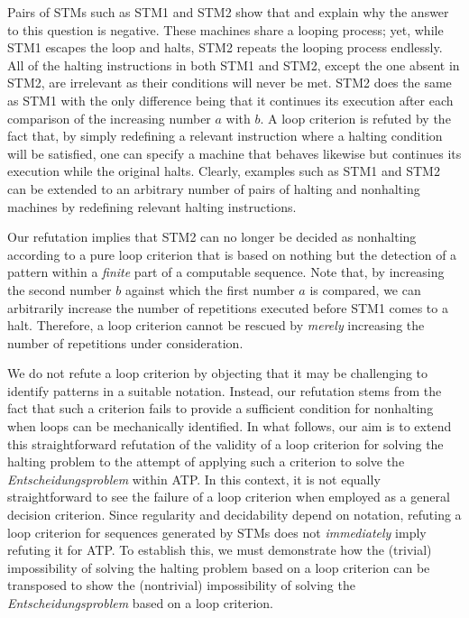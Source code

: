 \documentclass[%
  manuscript=article,   %
  year=2024,
  volume=77,
  doi=00000.000,
]{zfn}
\begin{document}
Pairs of STMs such as STM1 and STM2 show that and explain why the answer to this question is negative. 
These machines share a looping process; yet, while STM1 escapes the loop and halts, STM2 repeats the looping process endlessly. All of the halting instructions in both STM1 and STM2, except the one absent in STM2, are irrelevant as their conditions will never be met. STM2 does the same as STM1 with the only difference being that it continues its execution after each comparison of the increasing number $a$ with $b$.  A loop criterion is refuted by the fact that, by simply redefining a relevant instruction where a halting condition will be satisfied, one can specify a machine that behaves likewise but continues its execution while the original halts. Clearly, examples such as STM1 and STM2 can be extended to an arbitrary number of
pairs of halting and nonhalting machines by redefining relevant halting instructions.

Our refutation implies that STM2 can no longer be decided as nonhalting according to a pure loop criterion that is based on nothing but \label{assumption} the detection of a pattern within a \emph{finite} part of a computable sequence. Note that, by increasing the second number $b$ against which the first number $a$ is compared, we can arbitrarily increase the number of repetitions executed before STM1 comes to a halt. Therefore, a loop criterion cannot be rescued by \emph{merely} increasing the number of repetitions under consideration.

We do not refute a loop criterion by objecting that it may be challenging to identify patterns in a suitable notation. Instead, our refutation stems from the fact that such a criterion fails to provide a sufficient condition for nonhalting when loops can be mechanically identified. In what follows, our aim is to extend this straightforward refutation of the validity of a loop criterion for solving the halting problem to the attempt of applying such a criterion to solve the \emph{Entscheidungsproblem} within ATP. In this context, it is not equally straightforward to see the failure
of a loop criterion when employed as a general decision criterion.
Since regularity and decidability depend on notation, refuting a loop criterion for sequences generated by STMs does not \emph{immediately} imply refuting it for ATP. To establish this,
we must demonstrate how the (trivial) impossibility of solving the halting problem based on a loop criterion can be transposed to show the (nontrivial) impossibility of solving the \emph{Entscheidungsproblem} based on a loop criterion.
\end{document}

